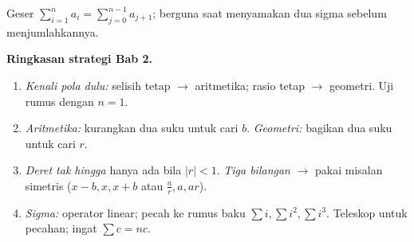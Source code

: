 \begin{variasi}
Geser $\sum_{i=1}^{n}a_i=\sum_{j=0}^{n-1}a_{j+1}$; berguna saat menyamakan dua
sigma sebelum menjumlahkannya.
\end{variasi}

\begin{tips}
\textbf{Ringkasan strategi Bab 2.}
\begin{enumerate}[leftmargin=*,topsep=2pt]
  \item \emph{Kenali pola dulu:} selisih tetap $\to$ aritmetika; rasio tetap
  $\to$ geometri. Uji rumus dengan $n=1$.
  \item \emph{Aritmetika:} kurangkan dua suku untuk cari $b$. \emph{Geometri:}
  bagikan dua suku untuk cari $r$.
  \item \emph{Deret tak hingga} hanya ada bila $|r|<1$. \emph{Tiga bilangan}
  $\to$ pakai misalan simetris ($x{-}b,x,x{+}b$ atau $\frac ar,a,ar$).
  \item \emph{Sigma:} operator linear; pecah ke rumus baku $\sum i,\sum i^2,\sum
  i^3$. Teleskop untuk pecahan; ingat $\sum c=nc$.
\end{enumerate}
\end{tips}


